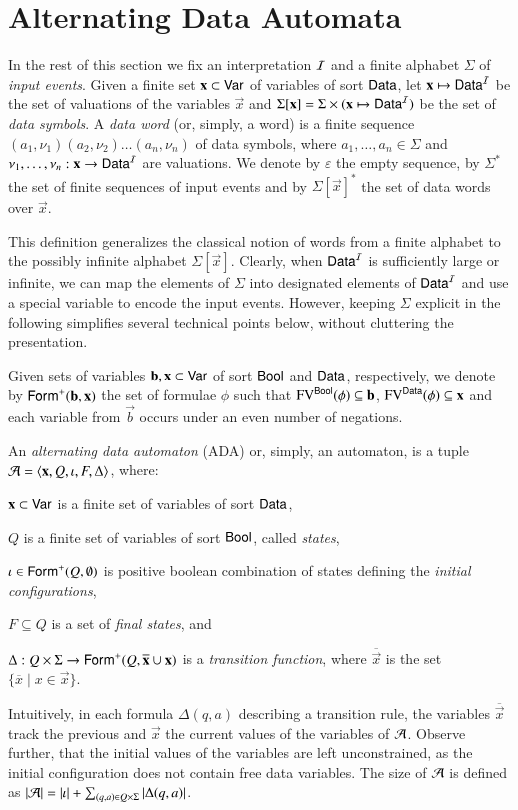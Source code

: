 \documentclass[10pt,conference,letterpaper,twocolumn]{IEEEtran}
\begin{document}
\section{Alternating Data Automata}

In the rest of this section we fix an interpretation $\mathcal{I}$ and a finite
alphabet $\Sigma$ of \emph{input events}. Given a finite set $\mathbf x
\subset \mathsf{Var}$ of variables of sort $\mathsf{Data}$, let $\mathbf x \mapsto
\mathsf{Data}^{\mathcal{I}}$ be the set of valuations of the variables $\vec{x}$ and
$\Sigma[\mathbf x] = \Sigma \times (\mathbf x \mapsto \mathsf{Data}^{\mathcal{I}})$ be the
set of \emph{data symbols}. A \emph{data word} (or, simply, a word) is
a finite sequence $(a_1,\nu_1)(a_2,\nu_2) \ldots (a_n,\nu_n)$ of data
symbols, where $a_1,\ldots,a_n \in \Sigma$ and $\nu_1,\ldots,\nu_n :
\mathbf x \rightarrow \mathsf{Data}^{\mathcal{I}}$ are valuations. We denote by
$\varepsilon$ the empty sequence, by $\Sigma^*$ the set of finite
sequences of input events and by $\Sigma[\vec{x}]^*$ the set of data
words over $\vec{x}$.

This definition generalizes the classical notion of words from a
finite alphabet to the possibly infinite alphabet
$\Sigma[\vec{x}]$. Clearly, when $\mathsf{Data}^{\mathcal{I}}$ is sufficiently large or
infinite, we can map the elements of $\Sigma$ into designated elements
of $\mathsf{Data}^{\mathcal{I}}$ and use a special variable to encode the input
events. However, keeping $\Sigma$ explicit in the following simplifies
several technical points below, without cluttering the presentation.

Given sets of variables $\mathbf b,\mathbf x \subset \mathsf{Var}$ of sort
$\mathsf{Bool}$ and $\mathsf{Data}$, respectively, we denote by
$\mathsf{Form}^+(\mathbf b,\mathbf x)$ the set of formulae $\phi$ such that
$\mathrm{FV}^{\mathsf{Bool}}(\phi) \subseteq \mathbf b$, $\mathrm{FV}^{\mathsf{Data}}(\phi) \subseteq
\mathbf x$ and each variable from $\vec{b}$ occurs under an even number
of negations. 

An \emph{alternating data automaton} (ADA) or, simply, an automaton,
is a tuple $\mathcal{A} =
\left\langle \mathbf x,Q,\iota,F,\Delta \right\rangle$, where: \begin{compactitem}
%
\item $\mathbf x \subset \mathsf{Var}$ is a finite set of variables of sort
  $\mathsf{Data}$,
%
\item $Q$ is a finite set of variables of sort $\mathsf{Bool}$, called
  \emph{states},
%
\item $\iota \in \mathsf{Form}^+(Q,\emptyset)$ is positive boolean combination
  of states defining the \emph{initial configurations},
%
\item $F \subseteq Q$ is a set of \emph{final states}, and
%
\item $\Delta : Q \times \Sigma \rightarrow
  \mathsf{Form}^+(Q,\overline{\mathbf x}\cup\mathbf x)$ is a \emph{transition
    function}, where $\overline{\vec{x}}$ is the set $\{\overline{x}
  \mid x \in \vec{x}\}$.
\end{compactitem}
Intuitively, in each formula $\Delta(q,a)$ describing a transition
rule, the variables $\overline{\vec{x}}$ track the previous and
$\vec{x}$ the current values of the variables of $\mathcal{A}$. Observe
further, that the initial values of the variables are left
unconstrained, as the initial configuration does not contain free
data variables. The size of $\mathcal{A}$ is defined as ${|{\mathcal{A}}|} = {|{\iota}|}
+ \sum_{(q,a) \in Q\times\Sigma}{|{\Delta(q,a)}|}$.
\end{document}
